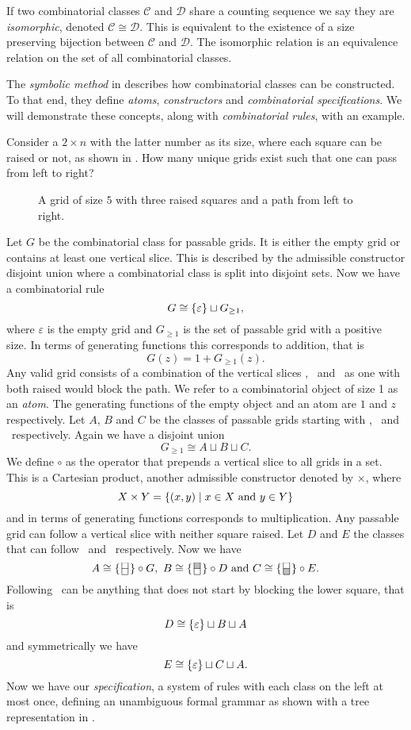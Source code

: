 If two combinatorial classes $\mathcal{C}$ and $\mathcal{D}$ share a counting sequence we say they are \emph{isomorphic}, denoted $\mathcal{C} \cong \mathcal{D}$. This is equivalent to the existence of a size preserving bijection between $\mathcal{C}$ and $\mathcal{D}$. The isomorphic relation is an equivalence relation on the set of all combinatorial classes.

The \emph{symbolic method} in  describes how combinatorial classes can be constructed. To that end, they define \emph{atoms}, \emph{constructors} and \emph{combinatorial specifications}. We will demonstrate these concepts, along with \emph{combinatorial rules}, with an example. 

Consider a $2 \times n$ with the latter number as its size, where each square can be raised or not, as shown in . How many unique grids exist such that one can pass from left to right?

\begin{figure}[htbp]
    \centering
    
    \caption{A grid of size $5$ with three raised squares and a path from left to right.}
    \label{fig:raised_grid}
\end{figure}

Let $G$ be the combinatorial class for passable grids. It is either the empty grid or contains at least one vertical slice. This is described by the admissible constructor disjoint union where a combinatorial class is split into disjoint sets. Now we have a combinatorial rule 
\[
    G \cong \left\{\varepsilon\right\} \sqcup G_{\geq 1},
\]
where $\varepsilon$ is the empty grid and $G_{\geq 1}$ is the set of passable grid with a positive size. In terms of generating functions this corresponds to addition, that is 
\[
    G(z) = 1 + G_{\geq1}(z).
\] 
Any valid grid consists of a combination of the vertical slices \gridN, \gridU\ and \gridD\ as one with both raised would block the path. We refer to a combinatorial object of size 1 as an \emph{atom}. The generating functions of the empty object and an atom are $1$ and $z$ respectively. Let $A$, $B$ and $C$ be the classes of passable grids starting with \gridN, \gridU\ and \gridD\ respectively. Again we have a disjoint union 
\[
    G_{\geq1} \cong A \sqcup B \sqcup C.
\]
We define $\circ$ as the operator that prepends a vertical slice to all grids in a set. This is a Cartesian product, another admissible constructor denoted by $\times$, where
\[
X \times Y = \left\{(x,y) \mid x\in X \text{ and } y \in Y\right\}
\]
and in terms of generating functions corresponds to multiplication. Any passable grid can follow a vertical slice with neither square raised. Let $D$ and $E$ the classes that can follow \gridU\ and \gridD\ respectively. Now we have 
\[
    A \cong \gridNSet \circ G, \ B \cong \gridUSet \circ D \text{ and } C \cong \gridDSet \circ E.
\]
Following \gridU\ can be anything that does not start by blocking the lower square, that is 
\[
    D \cong \left\{\varepsilon\right\} \sqcup B \sqcup A
\]
and symmetrically we have 
\[
    E \cong \left\{\varepsilon\right\} \sqcup C \sqcup A.
\]
Now we have our \emph{specification}, a system of rules with each class on the left at most once, defining an unambiguous formal grammar as shown with a tree representation in .


